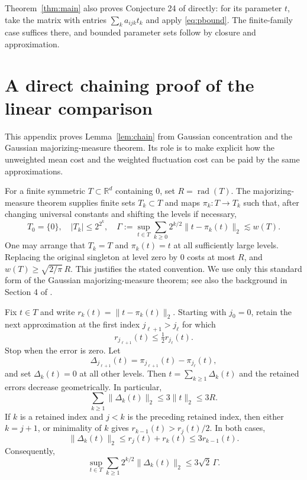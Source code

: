 \documentclass[11pt,a4paper]{article}
\numberwithin{equation}{section}
\theoremstyle{remark}
\newcommand{\R}{\mathbb R}
\newcommand{\norm}[1]{\lVert #1\rVert}
\newcommand{\rad}{\operatorname{rad}}
\begin{document}
Theorem~\ref{thm:main} also proves Conjecture 24 of \cite{ALM} directly: for its parameter $t$, take the matrix with entries $\sum_k a_{ijk}t_k$ and apply \eqref{eq:pbound}. The finite-family case suffices there, and bounded parameter sets follow by closure and approximation.

\clearpage
\appendix
\section{A direct chaining proof of the linear comparison}\label{app:chain}

This appendix proves Lemma~\ref{lem:chain} from Gaussian concentration and the Gaussian majorizing-measure theorem. Its role is to make explicit how the unweighted mean cost and the weighted fluctuation cost can be paid by the same approximations.

For a finite symmetric $T\subset\R^d$ containing $0$, set $R=\rad(T)$. The majorizing-measure theorem supplies finite sets $T_k\subset T$ and maps $\pi_k:T\to T_k$ such that, after changing universal constants and shifting the levels if necessary,
\begin{equation}
 T_0=\{0\},\quad |T_k|\le2^{2^k},\quad
 \Gamma:=\sup_{t\in T}\sum_{k\ge0}2^{k/2}
                 \norm{t-\pi_k(t)}_2\lesssim w(T).
 \label{eq:admissible}
\end{equation}
One may arrange that $T_k=T$ and $\pi_k(t)=t$ at all sufficiently large levels. Replacing the original singleton at level zero by $0$ costs at most $R$, and $w(T)\ge\sqrt{2/\pi}\,R$. This justifies the stated convention. We use only this standard form of the Gaussian majorizing-measure theorem; see also the background in Section 4 of \cite{Maurer}.

Fix $t\in T$ and write $r_k(t)=\norm{t-\pi_k(t)}_2$. Starting with $j_0=0$, retain the next approximation at the first index $j_{\ell+1}>j_\ell$ for which
\[
 r_{j_{\ell+1}}(t)\le\tfrac12 r_{j_\ell}(t).
\]
Stop when the error is zero. Let
\[
 \Delta_{j_{\ell+1}}(t)=\pi_{j_{\ell+1}}(t)-\pi_{j_\ell}(t),
\]
and set $\Delta_k(t)=0$ at all other levels. Then $t=\sum_{k\ge1}\Delta_k(t)$ and the retained errors decrease geometrically. In particular,
\begin{equation}
 \sum_{k\ge1}\norm{\Delta_k(t)}_2\le3\norm{t}_2\le3R.
 \label{eq:length-budget}
\end{equation}
If $k$ is a retained index and $j<k$ is the preceding retained index, then either $k=j+1$, or minimality of $k$ gives $r_{k-1}(t)>r_j(t)/2$. In both cases,
\[
 \norm{\Delta_k(t)}_2\le r_j(t)+r_k(t)\le3r_{k-1}(t).
\]
Consequently,
\begin{equation}
 \sup_{t\in T}\sum_{k\ge1}2^{k/2}\norm{\Delta_k(t)}_2
 \le3\sqrt2\,\Gamma.
 \label{eq:weighted-budget}
\end{equation}
\end{document}
